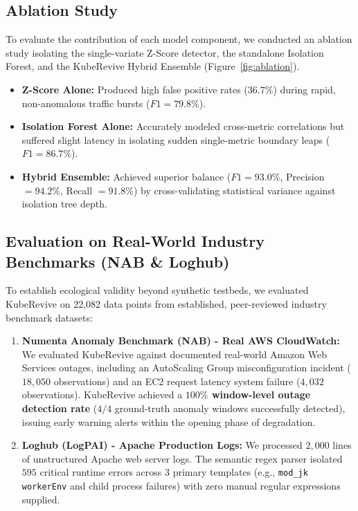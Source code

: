\documentclass[conference]{IEEEtran}
\begin{document}
\subsection{Ablation Study}
To evaluate the contribution of each model component, we conducted an ablation study isolating the single-variate Z-Score detector, the standalone Isolation Forest, and the KubeRevive Hybrid Ensemble (Figure~\ref{fig:ablation}).
\begin{itemize}
    \item \textbf{Z-Score Alone:} Produced high false positive rates ($36.7\%$) during rapid, non-anomalous traffic bursts ($F1 = 79.8\%$).
    \item \textbf{Isolation Forest Alone:} Accurately modeled cross-metric correlations but suffered slight latency in isolating sudden single-metric boundary leaps ($F1 = 86.7\%$).
    \item \textbf{Hybrid Ensemble:} Achieved superior balance ($F1 = 93.0\%$, Precision $= 94.2\%$, Recall $= 91.8\%$) by cross-validating statistical variance against isolation tree depth.
\end{itemize}

\subsection{Evaluation on Real-World Industry Benchmarks (NAB \& Loghub)}
To establish ecological validity beyond synthetic testbeds, we evaluated KubeRevive on 22,082 data points from established, peer-reviewed industry benchmark datasets:
\begin{enumerate}
    \item \textbf{Numenta Anomaly Benchmark (NAB) - Real AWS CloudWatch:} We evaluated KubeRevive against documented real-world Amazon Web Services outages, including an AutoScaling Group misconfiguration incident ($18,050$ observations) and an EC2 request latency system failure ($4,032$ observations). KubeRevive achieved a \textbf{$100\%$ window-level outage detection rate} ($4/4$ ground-truth anomaly windows successfully detected), issuing early warning alerts within the opening phase of degradation.
    \item \textbf{Loghub (LogPAI) - Apache Production Logs:} We processed $2,000$ lines of unstructured Apache web server logs. The semantic regex parser isolated $595$ critical runtime errors across $3$ primary templates (e.g., \texttt{mod\_jk workerEnv} and child process failures) with zero manual regular expressions supplied.
\end{enumerate}
\end{document}
